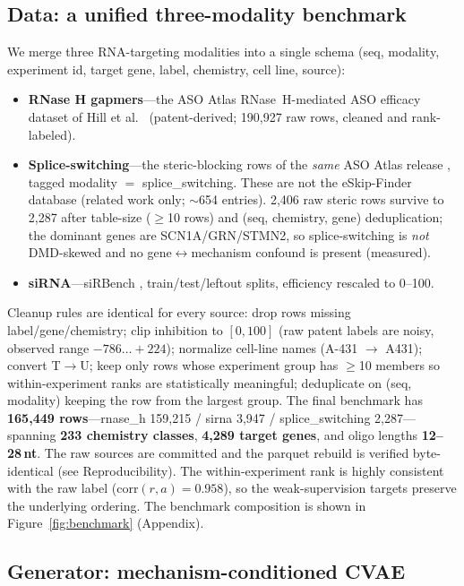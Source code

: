\documentclass{article} %
\begin{document}
\subsection{Data: a unified three-modality benchmark}

We merge three RNA-targeting modalities into a single schema (seq, modality, experiment id, target gene, label, chemistry, cell line, source):
\begin{itemize}
\item \textbf{RNase H gapmers}---the ASO Atlas RNase~H-mediated ASO efficacy dataset of Hill et al.\ \citep{hill2025} (patent-derived; 190{,}927 raw rows, cleaned and rank-labeled).
\item \textbf{Splice-switching}---the steric-blocking rows of the \emph{same} ASO Atlas release \citep{hill2025}, tagged modality $=$ splice\_switching. These are not the eSkip-Finder database \citep{chiba2021} (related work only; $\sim$654 entries). 2{,}406 raw steric rows survive to 2{,}287 after table-size ($\ge$10 rows) and (seq, chemistry, gene) deduplication; the dominant genes are SCN1A/GRN/STMN2, so splice-switching is \emph{not} DMD-skewed and no gene$\leftrightarrow$mechanism confound is present (measured).
\item \textbf{siRNA}---siRBench \citep{karmakar2026}, train/test/leftout splits, efficiency rescaled to 0--100.
\end{itemize}

Cleanup rules are identical for every source: drop rows missing label/gene/chemistry; clip inhibition to $[0, 100]$ (raw patent labels are noisy, observed range $-786\ldots+224$); normalize cell-line names (A-431 $\rightarrow$ A431); convert T$\rightarrow$U; keep only rows whose experiment group has $\ge$10 members so within-experiment ranks are statistically meaningful; deduplicate on (seq, modality) keeping the row from the largest group. The final benchmark has \textbf{165{,}449 rows}---rnase\_h 159{,}215 / sirna 3{,}947 / splice\_switching 2{,}287---spanning \textbf{233 chemistry classes}, \textbf{4{,}289 target genes}, and oligo lengths \textbf{12--28\,nt}. The raw sources are committed and the parquet rebuild is verified byte-identical (see Reproducibility). The within-experiment rank is highly consistent with the raw label ($\mathrm{corr}(r, a) = 0.958$), so the weak-supervision targets preserve the underlying ordering. The benchmark composition is shown in Figure~\ref{fig:benchmark} (Appendix).

\subsection{Generator: mechanism-conditioned CVAE}
\end{document}
